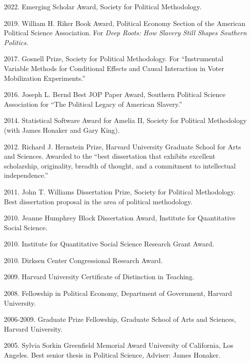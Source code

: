 \documentclass[11pt,article,oneside]{memoir}
\begin{document}
\begin{cvlist}
\item 2022. Emerging Scholar Award, Society for Political Methodology. 
  
\item  2019. William H. Riker Book Award, Political Economy Section of the American Political Science Association. For \emph{Deep Roots: How Slavery Still Shapes Southern Politics}. 

\item  2017. Gosnell Prize, Society for Political Methodology. For ``Instrumental Variable Methods for Conditional Effects and Causal Interaction in Voter Mobilization Experiments.'' 

\item  2016. Joseph L. Bernd Best JOP Paper Award, Southern Political Science Association for ``The Political Legacy of American Slavery.''

\item  2014. Statistical Software Award for Amelia II, Society for Political Methodology (with James Honaker and Gary King). 

\item  2012. Richard J. Hernstein Prize, Harvard University Graduate School
for Arts and Sciences. Awarded to the ``best dissertation that exhibits excellent scholarship, originality, breadth of 
thought, and a commitment to intellectual independence.'' 

\item  2011. John T. Williams Dissertation Prize, Society for Political Methodology. Best dissertation proposal in the area of political methodology.

\item  2010. Jeanne Humphrey Block Dissertation Award, Institute for Quantitative Social Science.

\item  2010. Institute for Quantitative Social Science Research Grant Award. 

\item  2010. Dirksen Center Congressional Research Award.

\item  2009. Harvard University Certificate of Distinction in Teaching.

\item  2008. Fellowship in Political Economy, Department of Government, Harvard
University.

\item  2006-2009. Graduate Prize Fellowship, Graduate School of Arts and Sciences, Harvard
University.

\item  2005. Sylvia Sorkin Greenfield Memorial Award University of California, Los Angeles. Best senior thesis in Political Science, Adviser: James Honaker.
\end{cvlist}
\end{document}
